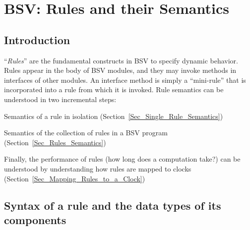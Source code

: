 

\chapter{BSV: Rules and their Semantics}


\setcounter{page}{1}
\renewcommand{\thepage}{\arabic{chapter}-\arabic{page}}

\label{ch_Rules_I}


\section{Introduction}

``\emph{Rules}'' are the fundamental constructs in BSV to specify
dynamic behavior.  Rules appear in the body of BSV modules, and they
may invoke methods in interfaces of other modules.  An interface
method is simply a ``mini-rule'' that is incorporated into a rule from
which it is invoked.  Rule semantics can be understood in two
incremental steps:

\begin{tightlist}

 \item Semantics of a rule in isolation (Section~\ref{Sec_Single_Rule_Semantics})

 \item Semantics of the collection of rules in a BSV program
       (Section~\ref{Sec_Rules_Semantics})

\end{tightlist}

Finally, the performance of rules (how long does a computation take?)
can be understood by understanding how rules are mapped to clocks
(Section~\ref{Sec_Mapping_Rules_to_a_Clock})


\section{Syntax of a rule and the data types of its components}

